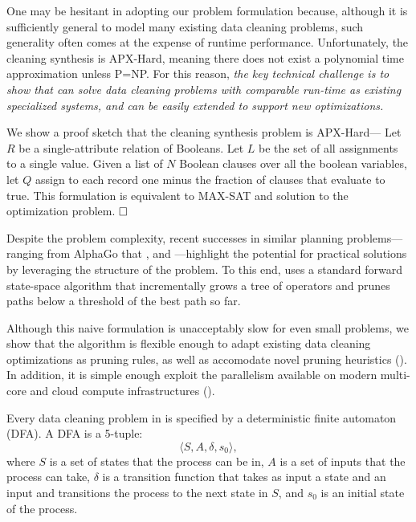 One may be hesitant in adopting our problem formulation because, although it is sufficiently general to model many existing data cleaning problems, such generality often comes at the expense of runtime performance.   Unfortunately, the cleaning synthesis is APX-Hard, meaning there does not exist a polynomial time approximation unless P=NP.  For this reason, {\it the key technical challenge is to show that \sys can solve data cleaning problems with comparable run-time as existing specialized systems, and can be easily extended to support new optimizations.}

\begin{theorem}
We show a proof sketch that the cleaning synthesis problem is APX-Hard---
Let $R$ be a single-attribute relation of Booleans. Let $L$ be the set of all assignments to a single value.
Given a list of $N$ Boolean clauses over all the boolean variables, let $Q$ assign to each record one minus the fraction of clauses that evaluate to true. This formulation is equivalent to MAX-SAT and solution to the optimization problem. $\square$
\end{theorem}

Despite the problem complexity, recent successes in similar planning problems---ranging from AlphaGo that , and ---highlight the potential for practical solutions by leveraging the structure of the problem.  To this end, \sys uses a standard forward state-space algorithm that incrementally grows a tree of operators and prunes paths below a threshold of the best path so far. 

Although this naive formulation is unacceptably slow for even small problems, we show that the algorithm is flexible enough to adapt existing data cleaning optimizations as pruning rules, as well as accomodate novel pruning heuristics ().  In addition, it is simple enough exploit the parallelism available on modern multi-core and cloud compute infrastructures ().


    Every data cleaning problem in \sys is specified by a deterministic finite automaton (DFA). 
    A DFA is a 5-tuple:
    \[\langle S, A, \delta, s_0\rangle,\]
    where $S$ is a set of states that the process can be in, $A$ is a set of inputs that the process can take, $\delta$ is a transition function that takes as input a state and an input and transitions the process to the next state in $S$, and $s_0$ is an initial state of the process.

